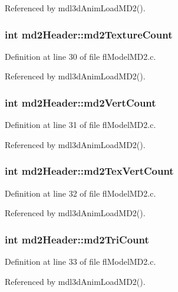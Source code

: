Referenced by mdl3d\-Anim\-Load\-MD2().
\subsubsection{\setlength{\rightskip}{0pt plus 5cm}int {\bf md2Header::md2Texture\-Count}}\label{structmd2Header_d51c64989b9d0a2e9d3b9a9e04e0d15b}




Definition at line 30 of file fl\-Model\-MD2.c.

Referenced by mdl3d\-Anim\-Load\-MD2().
\subsubsection{\setlength{\rightskip}{0pt plus 5cm}int {\bf md2Header::md2Vert\-Count}}\label{structmd2Header_9777ae802f1e96d5ac7c1e547b8aa65b}




Definition at line 31 of file fl\-Model\-MD2.c.

Referenced by mdl3d\-Anim\-Load\-MD2().
\subsubsection{\setlength{\rightskip}{0pt plus 5cm}int {\bf md2Header::md2Tex\-Vert\-Count}}\label{structmd2Header_cd583db74a07d20c4c5c8bff540d0bad}




Definition at line 32 of file fl\-Model\-MD2.c.

Referenced by mdl3d\-Anim\-Load\-MD2().
\subsubsection{\setlength{\rightskip}{0pt plus 5cm}int {\bf md2Header::md2Tri\-Count}}\label{structmd2Header_65810db04ae6fc922c9fac3305bf4cb2}




Definition at line 33 of file fl\-Model\-MD2.c.

Referenced by mdl3d\-Anim\-Load\-MD2().

